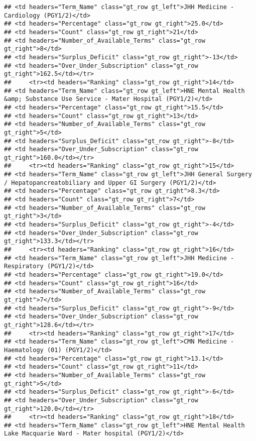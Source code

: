 \documentclass[
]{article}
\begin{document}
\begin{verbatim}
## <td headers="Term_Name" class="gt_row gt_left">JHH Medicine - Cardiology (PGY1/2)</td>
## <td headers="Percentage" class="gt_row gt_right">25.0</td>
## <td headers="Count" class="gt_row gt_right">21</td>
## <td headers="Number_of_Available_Terms" class="gt_row gt_right">8</td>
## <td headers="Surplus_Deficit" class="gt_row gt_right">-13</td>
## <td headers="Over_Under_Subscription" class="gt_row gt_right">162.5</td></tr>
##     <tr><td headers="Ranking" class="gt_row gt_right">14</td>
## <td headers="Term_Name" class="gt_row gt_left">HNE Mental Health &amp; Substance Use Service - Mater Hospital (PGY1/2)</td>
## <td headers="Percentage" class="gt_row gt_right">15.5</td>
## <td headers="Count" class="gt_row gt_right">13</td>
## <td headers="Number_of_Available_Terms" class="gt_row gt_right">5</td>
## <td headers="Surplus_Deficit" class="gt_row gt_right">-8</td>
## <td headers="Over_Under_Subscription" class="gt_row gt_right">160.0</td></tr>
##     <tr><td headers="Ranking" class="gt_row gt_right">15</td>
## <td headers="Term_Name" class="gt_row gt_left">JHH General Surgery / Hepatopancreatobiliary and Upper GI Surgery (PGY1/2)</td>
## <td headers="Percentage" class="gt_row gt_right">8.3</td>
## <td headers="Count" class="gt_row gt_right">7</td>
## <td headers="Number_of_Available_Terms" class="gt_row gt_right">3</td>
## <td headers="Surplus_Deficit" class="gt_row gt_right">-4</td>
## <td headers="Over_Under_Subscription" class="gt_row gt_right">133.3</td></tr>
##     <tr><td headers="Ranking" class="gt_row gt_right">16</td>
## <td headers="Term_Name" class="gt_row gt_left">JHH Medicine - Respiratory (PGY1/2)</td>
## <td headers="Percentage" class="gt_row gt_right">19.0</td>
## <td headers="Count" class="gt_row gt_right">16</td>
## <td headers="Number_of_Available_Terms" class="gt_row gt_right">7</td>
## <td headers="Surplus_Deficit" class="gt_row gt_right">-9</td>
## <td headers="Over_Under_Subscription" class="gt_row gt_right">128.6</td></tr>
##     <tr><td headers="Ranking" class="gt_row gt_right">17</td>
## <td headers="Term_Name" class="gt_row gt_left">CMN Medicine - Haematology (01) (PGY1/2)</td>
## <td headers="Percentage" class="gt_row gt_right">13.1</td>
## <td headers="Count" class="gt_row gt_right">11</td>
## <td headers="Number_of_Available_Terms" class="gt_row gt_right">5</td>
## <td headers="Surplus_Deficit" class="gt_row gt_right">-6</td>
## <td headers="Over_Under_Subscription" class="gt_row gt_right">120.0</td></tr>
##     <tr><td headers="Ranking" class="gt_row gt_right">18</td>
## <td headers="Term_Name" class="gt_row gt_left">HNE Mental Health Lake Macquarie Ward - Mater hospital (PGY1/2)</td>

\end{verbatim}
\end{document}

